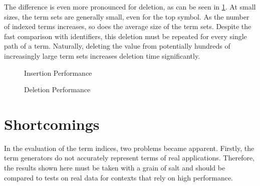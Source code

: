 The difference is even more pronounced for deletion, as can be seen in \cref{delete}. At small sizes, the term sets are generally small, even for the top symbol. As the number of indexed terms increases, so does the average size of the term sets. Despite the fast comparison with identifiers, this deletion must be repeated for every single path of a term. Naturally, deleting the value from potentially hundreds of increasingly large term sets increases deletion time significantly.

\begin{figure}[h]
  \begin{minipage}{0.45\textwidth}
\begin{adjustbox}{width=1\textwidth}
\end{adjustbox}
\caption{Insertion Performance}
\label{insert}
\end{minipage}
\begin{minipage}{0.1\textwidth}
\end{minipage}
\begin{minipage}{0.45\textwidth}
\begin{adjustbox}{width=1\textwidth}
\end{adjustbox}
\caption{Deletion Performance}
\label{delete}
\end{minipage}
\end{figure}

\section{Shortcomings} \label{shortcomings}
In the evaluation of the term indices, two problems became apparent. Firstly, the term generators do not accurately represent terms of real applications. Therefore, the results shown here must be taken with a grain of salt and should be compared to tests on real data for contexts that rely on high performance.

